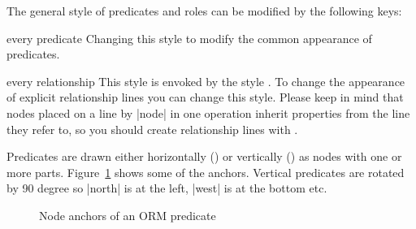 \documentclass[a4paper,10pt]{article}
\begin{document}
\noindent The general style of predicates and roles can be modified by the following keys:

\begin{stylekey}{every predicate}
Changing this style to modify the common appearance of predicates.
\begin{codeexample}[width=3cm]
\end{codeexample}
\end{stylekey}

\begin{stylekey}{every relationship}
  This style is envoked by the style . To change the appearance of explicit relationship lines you can change this style. Please keep in mind that nodes placed on a line by |node| in one operation inherit properties from  the line they refer to, so you should create relationship lines with .
\begin{codeexample}[width=3cm]
\end{codeexample}
\end{stylekey}

\noindent
Predicates are drawn either horizontally () or vertically () as nodes with one or more parts. Figure~\ref{fig:hanchors} shows some of the anchors. Vertical predicates are rotated by 90 degree so |north| is at the left, |west| is at the bottom etc.

\begin{figure}[h]
\centering
\begin{codeexample}[width=10cm]
\Large
{}
\end{codeexample}
\caption{Node anchors of an ORM predicate}
\label{fig:hanchors}
\end{figure}
\end{document}
